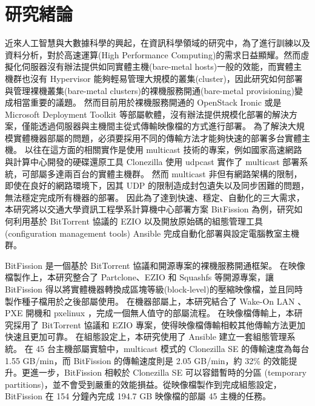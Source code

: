 \chapter{研究緒論}
\label{c:intro}
近來人工智慧與大數據科學的興起，在資訊科學領域的研究中，為了進行訓練以及資料分析，對於高速運算(High Performance Computing)的需求日益顯耀。然而虛擬化伺服器沒有辦法提供如同實體主機(bare-metal hosts)一般的效能，而實體主機群也沒有 Hypervisor 能夠輕易管理大規模的叢集(cluster)，因此研究如何部署與管理裸機叢集(bare-metal clusters)的裸機服務開通(bare-metal provisioning)變成相當重要的議題。
然而目前用於裸機服務開通的 OpenStack Ironic 或是 Microsoft Deployment Toolkit 等部屬軟體，沒有辦法提供規模化部署的解決方案，僅能透過伺服器與主機間主從式傳輸映像檔的方式進行部署。
為了解決大規模實體機器部屬的問題，必須要採用不同的傳輸方法才能夠快速的部署多台實體主機。
以往在這方面的相關實作是使用 multicast 技術的專案，例如國家高速網路與計算中心開發的硬碟還原工具 Clonezilla\cite{shiau2008clonezilla} 使用 udpcast 實作了 multicast 部署系統，可部屬多達兩百台的實體主機群。
然而 multicast 非但有網路架構的限制，即使在良好的網路環境下，因其 UDP 的限制造成封包遺失以及同步困難的問題，無法穩定完成所有機器的部署。
因此為了達到快速、穩定、自動化的三大需求，本研究將以交通大學資訊工程學系計算機中心部署方案 BitFission 為例，研究如何利用基於 BitTorrent 協議的 EZIO 以及開放原始碼的組態管理工具 (configuration management tools) Ansible 完成自動化部署與設定電腦教室主機群。

BitFission 是一個基於 BitTorrent 協議和開源專案的裸機服務開通框架。
在映像檔製作上，本研究整合了 Partclone、EZIO 和 Squashfs 等開源專案，讓 BitFission 得以將實體機器轉換成區塊等級(block-level)的壓縮映像檔，並且同時製作種子檔用於之後部屬使用。
在機器部屬上，本研究結合了 Wake-On LAN 、PXE 開機和 pxelinux ，完成一個無人值守的部屬流程。
在映像檔傳輸上，本研究採用了 BitTorrent 協議和 EZIO 專案，使得映像檔傳輸相較其他傳輸方法更加快速且更加可靠。
在組態設定上，本研究使用了 Ansible 建立一套組態管理系統。
在 45 台主機部屬實驗中，multicast 模式的 Clonezilla SE 的傳輸速度為每台 1.55 GB/min，而 BitFission 的傳輸速度則是 2.05 GB/min，約 32\% 的效能提升。更進一步，BitFission 相較於 Clonezilla SE 可以容錯暫時的分區 (temporary partitions)，並不會受到嚴重的效能損益。從映像檔製作到完成組態設定，BitFission 在 154 分鐘內完成 194.7 GB 映像檔的部屬 45 主機的任務。


